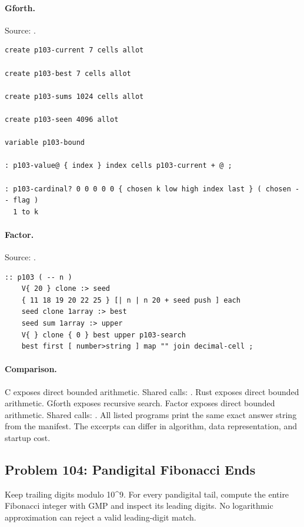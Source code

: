 \paragraph{Gforth.} Source: .
\begin{lstlisting}
create p103-current 7 cells allot

create p103-best 7 cells allot

create p103-sums 1024 cells allot

create p103-seen 4096 allot

variable p103-bound

: p103-value@ { index } index cells p103-current + @ ;

: p103-cardinal? 0 0 0 0 0 { chosen k low high index last } ( chosen -- flag )
  1 to k
\end{lstlisting}

\paragraph{Factor.} Source: .
\begin{lstlisting}
:: p103 ( -- n )
    V{ 20 } clone :> seed
    { 11 18 19 20 22 25 } [| n | n 20 + seed push ] each
    seed clone 1array :> best
    seed sum 1array :> upper
    V{ } clone { 0 } best upper p103-search
    best first [ number>string ] map "" join decimal-cell ;
\end{lstlisting}

\paragraph{Comparison.}
C exposes direct bounded arithmetic. Shared calls: \texttt{}. Rust exposes direct bounded arithmetic. Gforth exposes recursive search. Factor exposes direct bounded arithmetic. Shared calls: \texttt{}.
All listed programs print the same exact answer string from the manifest. The excerpts can differ in algorithm, data representation, and startup cost.

\subsection{Problem 104: Pandigital Fibonacci Ends}
\label{walkthrough:p104}
Keep trailing digits modulo 10\textasciicircum{}9. For every pandigital tail, compute the entire Fibonacci integer with GMP and inspect its leading digits. No logarithmic approximation can reject a valid leading-digit match.

